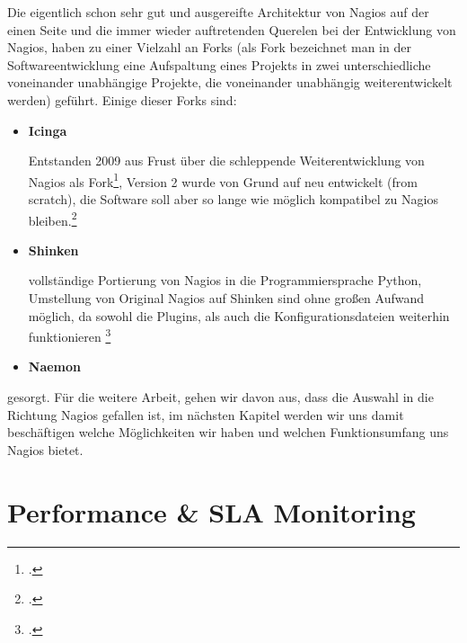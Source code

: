 \documentclass[12pt,a4paper,parskip,listof=totoc,bibliography=totoc]{scrreprt}
\begin{document}
	Die eigentlich schon sehr gut und ausgereifte Architektur von Nagios auf der einen Seite und die immer wieder auftretenden Querelen bei der Entwicklung von Nagios, haben zu einer Vielzahl an Forks (als Fork bezeichnet man in der Softwareentwicklung eine Aufspaltung eines Projekts in zwei unterschiedliche voneinander unabhängige Projekte, die voneinander unabhängig weiterentwickelt werden) geführt. 
	Einige dieser Forks sind:
	\begin{itemize}
		\item \textbf{Icinga} 
		
		Entstanden 2009 aus Frust über die schleppende Weiterentwicklung von Nagios als Fork\footcite{icingaabspaltung}, Version 2 wurde von Grund auf neu entwickelt (\glqq from scratch\grqq), die Software soll aber so lange wie möglich kompatibel zu Nagios bleiben.\footcite{icingafaq}
		\item \textbf{Shinken}
		
		vollständige Portierung von Nagios in die Programmiersprache Python, Umstellung von Original Nagios auf Shinken sind ohne großen Aufwand möglich, da sowohl die Plugins, als auch die Konfigurationsdateien weiterhin funktionieren \footcite{shinkenabout}
		\item \textbf{Naemon}
	\end{itemize} gesorgt. Für die weitere Arbeit, gehen wir davon aus, dass die Auswahl in die Richtung Nagios gefallen ist, im nächsten Kapitel werden wir uns damit beschäftigen welche Möglichkeiten wir haben und welchen Funktionsumfang uns Nagios bietet.
	
	
	\section{Performance \& SLA Monitoring}
\end{document}
